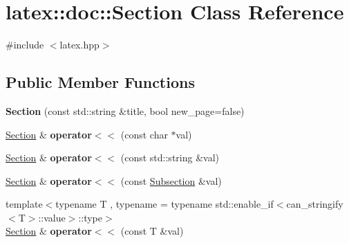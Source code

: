 \hypertarget{classlatex_1_1doc_1_1Section}{\section{latex\-:\-:doc\-:\-:Section Class Reference}
\label{classlatex_1_1doc_1_1Section}
}


{\ttfamily \#include $<$latex.\-hpp$>$}

\subsection*{Public Member Functions}
\begin{DoxyCompactItemize}
\item 
\hypertarget{classlatex_1_1doc_1_1Section_a99c69592d8b4c6ef13104554a089acae}{{\bfseries Section} (const std\-::string \&title, bool new\-\_\-page=false)}\label{classlatex_1_1doc_1_1Section_a99c69592d8b4c6ef13104554a089acae}

\item 
\hypertarget{classlatex_1_1doc_1_1Section_a53e777158eda75ac8f5cac6362d9f174}{\hyperlink{classlatex_1_1doc_1_1Section}{Section} \& {\bfseries operator$<$$<$} (const char $\ast$val)}\label{classlatex_1_1doc_1_1Section_a53e777158eda75ac8f5cac6362d9f174}

\item 
\hypertarget{classlatex_1_1doc_1_1Section_a92952468be4cbb0d120130e3758d4477}{\hyperlink{classlatex_1_1doc_1_1Section}{Section} \& {\bfseries operator$<$$<$} (const std\-::string \&val)}\label{classlatex_1_1doc_1_1Section_a92952468be4cbb0d120130e3758d4477}

\item 
\hypertarget{classlatex_1_1doc_1_1Section_aae377afedd501650c33197a086f7e4b0}{\hyperlink{classlatex_1_1doc_1_1Section}{Section} \& {\bfseries operator$<$$<$} (const \hyperlink{classlatex_1_1doc_1_1Subsection}{Subsection} \&val)}\label{classlatex_1_1doc_1_1Section_aae377afedd501650c33197a086f7e4b0}

\item 
\hypertarget{classlatex_1_1doc_1_1Section_ad48591936cf908cf47b311648cd9c436}{{\footnotesize template$<$typename T , typename  = typename std\-::enable\-\_\-if$<$can\-\_\-stringify$<$\-T$>$\-::value$>$\-::type$>$ }\\\hyperlink{classlatex_1_1doc_1_1Section}{Section} \& {\bfseries operator$<$$<$} (const T \&val)}\label{classlatex_1_1doc_1_1Section_ad48591936cf908cf47b311648cd9c436}


\end{DoxyCompactItemize}
